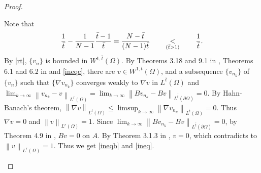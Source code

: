 \documentclass[11pt, a4paper]{article}
\numberwithin{equation}{section}
\newcommand{\coex}[2][\hphantom{longexplanation}]{%
  \underset{{#1}}{\overset{\hphantom{longexplanation}}{#2}}
}
\newcommand{\hk}{\hspace*{.12in}}
\newcommand{\norm}[1]{\left\lVert #1\right\rVert}
\begin{document}
\begin{proof}
\begin{itemize}[wide]
Note that
\begin{equation}
\frac{1}{\bar{t}}-\frac{1}{N-1}\frac{\bar{t}-1}{\bar{t}}=\frac{N-\bar{t}}{(N-1)\bar{t}} \coex[(\bar{t}>1)]{<} \frac{1}{\bar{t}}.
\label{ineqc}
\end{equation}\hk
By \eqref{rt}, $\{v_{n}\}$ is bounded in $W^{1,\bar{t}}(\Omega)$. By
Theorems 3.18 and 9.1 in \cite{brezisFunctionalAnalysisSobolev2011},
Theorems 6.1 and 6.2 in \cite{necasMethodesDirectesTheorie1967} and
\eqref{ineqc}, there are $v\in W^{1,\bar{t}}(\Omega)$, and a subsequence
$\{v_{n_{k}}\}$ of $\{v_{n}\}$ such that $\{\nabla v_{n_{k}}\}$
converges weakly to $\nabla v$ in $L^{\bar{t}}(\Omega)$ and
$\lim_{k\to\infty}\norm{v_{n_{k}}-v}_{L^{r}(\Omega)}=\lim_{k\to\infty}\norm{Bv_{n_{k}}-Bv}_{L^{\bar{t}}(\partial
  \Omega)}=0$. By Hahn-Banach's theorem,
$\norm{\nabla v}_{L^{\bar{t}}(\Omega)}\le \limsup_{k\to\infty}\norm{\nabla
  v_{n_{k}}}_{L^{\bar{t}}(\Omega)}=0$. Thus $\nabla v=0$ and
$\norm{v}_{L^{r}(\Omega)}=1$.  Since
$\lim_{k\to\infty}\norm{Bv_{n_{k}}-Bv}_{L^{\bar{t}}(\partial \Omega)}=0$, by
Theorem 4.9 in \cite[p.94]{brezisFunctionalAnalysisSobolev2011},
$Bv=0$ on $A$. By Theorem 3.1.3 in
\cite[p.64]{morreyMultipleIntegralsCalculus1966}, $v=0$, which
contradicts to $\norm{v}_{L^{r}(\Omega)}=1$. Thus we get \eqref{ineqb}
and \eqref{ineq}.
\end{itemize}
\end{proof}
\end{document}
